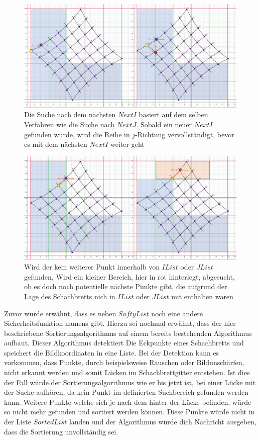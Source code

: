 \begin{figure}[!htb]
	\centering
	\includegraphics[width=0.8\linewidth]{images/VerzeichnetesSchachbrett_5.png}
	\caption[Suche nach dem nächsten $NextI$]{Die Suche nach dem nächsten $NextI$ basiert auf dem selben Verfahren wie die Suche nach $NextJ$. Sobald ein neuer $NextI$ gefunden wurde, wird die Reihe in $j$-Richtung vervollständigt, bevor es mit dem nächsten $NextI$ weiter geht}
	\label{fig:FindNextIPoint}
\end{figure}

\begin{figure}[!htb]
	\centering
	\includegraphics[width=0.8\linewidth]{images/VerzeichnetesSchachbrett_6.png}
	\caption[Sicherheitsfunktion $SaftyList$]{Wird der kein weiterer Punkt innerhalb von $IList$ oder $JList$ gefunden, Wird ein kleiner Bereich, hier in rot hinterlegt, abgesucht, ob es doch noch potentielle nächste Punkte gibt, die aufgrund der Lage des Schachbretts nich in $IList$ oder $JList$ mit enthalten waren}
	\label{fig:SaftyList}
\end{figure}


Zuvor wurde erwähnt, dass es neben $SaftyList$ noch eine andere Sicherheitsfunktion namens gibt. Hierzu sei nochmal erwähnt, dass der hier beschriebene Sortierungsalgorithmus auf einem bereits bestehenden Algorithmus aufbaut. Dieser Algorithmus detektiert Die Eckpunkte eines Schachbretts und speichert die Bildkoordinaten in eine Liste. Bei der Detektion kann es vorkommen, dass Punkte, durch beispielsweise Rauschen oder Bildunschärfen, nicht erkannt werden und somit Lücken im Schachbrettgitter entstehen. Ist dies der Fall würde der Sortierungsalgorithmus wie er bis jetzt ist, bei einer Lücke mit der Suche aufhören, da kein Punkt im definierten Suchbereich gefunden werden kann. Weitere Punkte welche sich je nach dem hinter der Lücke befinden, würde so nicht mehr gefunden und sortiert werden können. Diese Punkte würde nicht in der Liste $SortedList$ landen und der Algorithmus würde dich Nachricht ausgeben, dass die Sortierung unvollständig sei.\\

